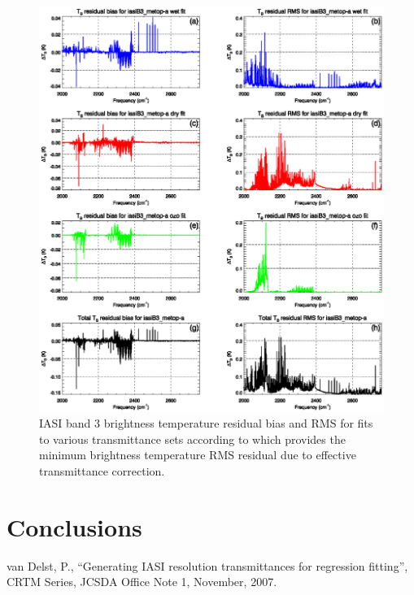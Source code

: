 \begin{figure}[htp]
  \centering
  \includegraphics[scale=0.8]{graphics/stats/new/iasiB3_metop-a.FitStats.eps}
  \caption{IASI band 3 brightness temperature residual bias and RMS for fits to various transmittance sets according to which provides the minimum brightness temperature RMS residual due to effective transmittance correction.}
  \label{fig:new_iasiB3_stats}
\end{figure}



\section{Conclusions}



\begin{thebibliography}{99}
   van Delst, P., ``Generating IASI resolution transmittances for regression fitting'', CRTM Series, JCSDA Office Note 1, November, 2007.
\end{thebibliography}



\begin{appendix}

  
  

\end{appendix}




